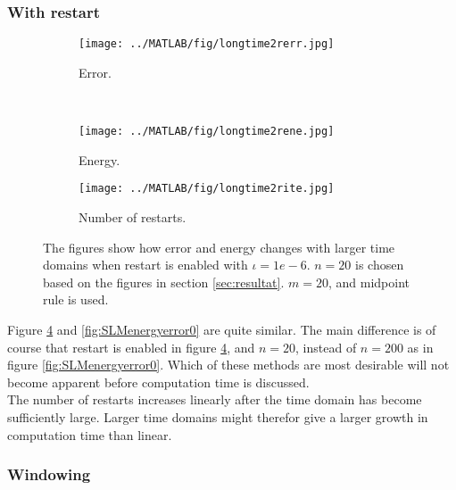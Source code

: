 \subsubsection{With restart} %
\begin{figure}[H]
        \centering
        \begin{subfigure}[b]{0.45\textwidth}
                \texttt{[image: ../MATLAB/fig/longtime2rerr.jpg]}
                \caption{ Error. }
                \label{fig:longtime2rerr}
        \end{subfigure}
        ~
        \begin{subfigure}[b]{0.45\textwidth}
                \texttt{[image: ../MATLAB/fig/longtime2rene.jpg]}
                \caption{ Energy. }
                \label{fig:longtime8rerr}
        \end{subfigure}
     
        
        \begin{subfigure}[b]{0.45\textwidth}
                \texttt{[image: ../MATLAB/fig/longtime2rite.jpg]}
                \caption{ Number of restarts. }
                \label{fig:longtime2rene}
        \end{subfigure}
        \caption{ The figures show how error and energy changes with larger time domains when restart is enabled with $\iota = 1e-6$. $n = 20$ is chosen based on the figures in section \ref{sec:resultat}. $m = 20$, and midpoint rule is used. }
        \label{fig:SLMenergyerror1}
\end{figure}
Figure \ref{fig:SLMenergyerror1} and \ref{fig:SLMenergyerror0} are quite similar. The main difference is of course that restart is enabled in figure \ref{fig:SLMenergyerror1}, and $n = 20$, instead of $n = 200$ as in figure \ref{fig:SLMenergyerror0}. Which of these methods are most desirable will not become apparent before computation time is discussed. \\
The number of restarts increases linearly after the time domain has become sufficiently large. Larger time domains might therefor give a larger growth in computation time than linear. \\
\subsubsection{Windowing} %


